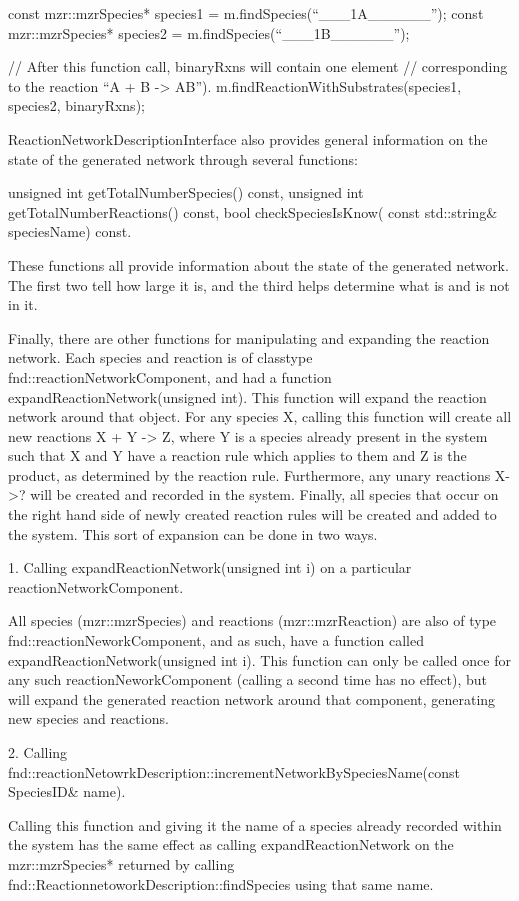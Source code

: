 \begin{1st listing}
const mzr::mzrSpecies* species1 = m.findSpecies(``___1A______'');
const mzr::mzrSpecies* species2 = m.findSpecies(``___1B______'');

// After this function call, binaryRxns will contain one element
// corresponding to the reaction ``A + B -> AB'').
m.findReactionWithSubstrates(species1, species2, binaryRxns);


ReactionNetworkDescriptionInterface also provides general information
on the state of the generated network through several functions:

unsigned int getTotalNumberSpecies() const, 
unsigned int getTotalNumberReactions() const,
bool checkSpeciesIsKnow( const std::string& speciesName) const.

These functions all provide information about the state of the
generated network.  The first two tell how large it is, and the third
helps determine what is and is not in it.  

Finally, there are other functions for manipulating and expanding the
reaction network.  Each species and reaction is of classtype
fnd::reactionNetworkComponent, and had a function
expandReactionNetwork(unsigned int).  This function will expand the
reaction network around that object.  For any species X, calling this
function will create all new reactions X + Y -> Z, where Y is a species
already present in the system such that X and Y have a reaction rule
which applies to them and Z is the product, as determined by the
reaction rule.  Furthermore, any unary reactions X->? will be created
and recorded in the system.  Finally, all species that occur on the
right hand side of newly created reaction rules will be created and
added to the system.  This sort of expansion can be done in two ways.

1.  Calling expandReactionNetwork(unsigned int i) on a particular
reactionNetworkComponent.

All species (mzr::mzrSpecies) and reactions (mzr::mzrReaction) are
also of type fnd::reactionNeworkComponent, and as such, have a function
called expandReactionNetwork(unsigned int i).  This function can only
be called once for any such reactionNeworkComponent (calling a second
time has no effect), but will expand the generated reaction network
around that component, generating new species and reactions.


2.  Calling
fnd::reactionNetowrkDescription::incrementNetworkBySpeciesName(const
SpeciesID& name).  

Calling this function and giving it the name of a species already
recorded within the system has the same effect as calling
expandReactionNetwork on the mzr::mzrSpecies* returned by calling
fnd::ReactionnetoworkDescription::findSpecies using that same name. 


\end{1st listing}
